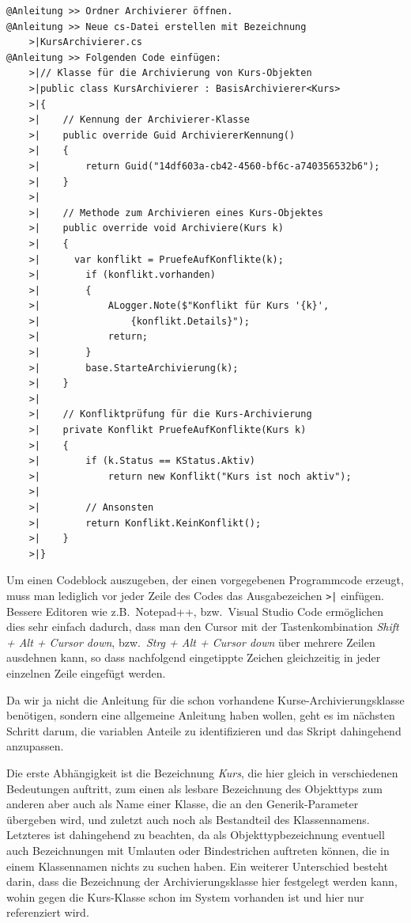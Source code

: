 \begin{verbatim}
@Anleitung >> Ordner Archivierer öffnen.
@Anleitung >> Neue cs-Datei erstellen mit Bezeichnung
    >|KursArchivierer.cs
@Anleitung >> Folgenden Code einfügen:
    >|// Klasse für die Archivierung von Kurs-Objekten
    >|public class KursArchivierer : BasisArchivierer<Kurs>
    >|{
    >|    // Kennung der Archivierer-Klasse
    >|    public override Guid ArchiviererKennung()
    >|    {
    >|        return Guid("14df603a-cb42-4560-bf6c-a740356532b6");
    >|    }
    >|
    >|    // Methode zum Archivieren eines Kurs-Objektes
    >|    public override void Archiviere(Kurs k)
    >|    {
    >|      var konflikt = PruefeAufKonflikte(k);
    >|        if (konflikt.vorhanden)
    >|        {
    >|            ALogger.Note($"Konflikt für Kurs '{k}', 
    >|                {konflikt.Details}");
    >|            return;
    >|        }
    >|        base.StarteArchivierung(k);
    >|    }
    >|    
    >|    // Konfliktprüfung für die Kurs-Archivierung
    >|    private Konflikt PruefeAufKonflikte(Kurs k)
    >|    {
    >|        if (k.Status == KStatus.Aktiv)
    >|            return new Konflikt("Kurs ist noch aktiv");
    >|        
    >|        // Ansonsten
    >|        return Konflikt.KeinKonflikt();
    >|    }
    >|}
\end{verbatim}

Um einen Codeblock auszugeben, der einen vorgegebenen Programmcode erzeugt, muss man lediglich vor jeder Zeile des Codes das Ausgabezeichen \verb=>|= einfügen. Bessere Editoren wie z.B.\ Notepad++, bzw.\ Visual Studio Code ermöglichen dies sehr einfach dadurch, dass man den Cursor mit der Tastenkombination \emph{Shift + Alt + Cursor down}, bzw.\ \emph{Strg + Alt + Cursor down} über mehrere Zeilen ausdehnen kann, so dass nachfolgend eingetippte Zeichen gleichzeitig in jeder einzelnen Zeile eingefügt werden.

Da wir ja nicht die Anleitung für die schon vorhandene Kurse-Archivierungsklasse benötigen, sondern eine allgemeine Anleitung haben wollen, geht es im nächsten Schritt darum, die variablen Anteile zu identifizieren und das Skript dahingehend anzupassen.

Die erste Abhängigkeit ist die Bezeichnung \emph{Kurs}, die hier gleich in verschiedenen Bedeutungen auftritt, zum einen als lesbare Bezeichnung des Objekttyps zum anderen aber auch als Name einer Klasse, die an den Generik-Parameter übergeben wird, und zuletzt auch noch als Bestandteil des Klassennamens. Letzteres ist dahingehend zu beachten, da als Objekttypbezeichnung eventuell auch Bezeichnungen mit Umlauten oder Bindestrichen auftreten können, die in einem Klassennamen nichts zu suchen haben. Ein weiterer Unterschied besteht darin, dass die Bezeichnung der Archivierungsklasse hier festgelegt werden kann, wohin gegen die Kurs-Klasse schon im System vorhanden ist und hier nur referenziert wird.

